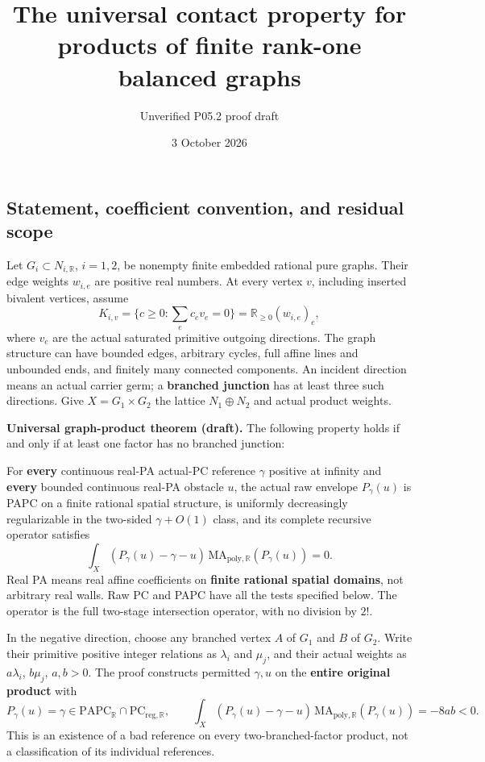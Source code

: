 \documentclass[
  11pt,
]{article}
\title{The universal contact property for products of finite rank-one
balanced graphs}
\author{Unverified P05.2 proof draft}
\date{3 October 2026}
\begin{document}
\maketitle

\subsection{Statement, coefficient convention, and residual
scope}\label{statement-coefficient-convention-and-residual-scope}

Let \(G_i\subset N_{i,\mathbb R}\), \(i=1,2\), be nonempty finite
embedded rational pure graphs. Their edge weights \(w_{i,e}\) are
positive real numbers. At every vertex \(v\), including inserted
bivalent vertices, assume \[
 K_{i,v}=\{c\geq0:\sum_e c_e v_e=0\}
       =\mathbb R_{\geq0}(w_{i,e})_e,                         \tag{1}
\] where \(v_e\) are the actual saturated primitive outgoing directions.
The graph structure can have bounded edges, arbitrary cycles, full
affine lines and unbounded ends, and finitely many connected components.
An incident direction means an actual carrier germ; a \textbf{branched
junction} has at least three such directions. Give \(X=G_1\times G_2\)
the lattice \(N_1\oplus N_2\) and actual product weights.

\textbf{Universal graph-product theorem (draft).} The following property
holds if and only if at least one factor has no branched junction:

For \textbf{every} continuous real-PA actual-PC reference \(\gamma\)
positive at infinity and \textbf{every} bounded continuous real-PA
obstacle \(u\), the actual raw envelope \(P_\gamma(u)\) is PAPC on a
finite rational spatial structure, is uniformly decreasingly
regularizable in the two-sided \(\gamma+O(1)\) class, and its complete
recursive operator satisfies \[
 \int_X(P_\gamma(u)-\gamma-u)\,
                \mathrm{MA}_{\mathrm{poly},\mathbb R}(P_\gamma(u))=0.
                                                               \tag{2}
\] Real PA means real affine coefficients on \textbf{finite rational
spatial domains}, not arbitrary real walls. Raw PC and PAPC have all the
tests specified below. The operator is the full two-stage intersection
operator, with no division by \(2!\).

In the negative direction, choose any branched vertex \(A\) of \(G_1\)
and \(B\) of \(G_2\). Write their primitive positive integer relations
as \(\lambda_i\) and \(\mu_j\), and their actual weights as
\(a\lambda_i\), \(b\mu_j\), \(a,b>0\). The proof constructs permitted
\(\gamma,u\) on the \textbf{entire original product} with \[
 P_\gamma(u)=\gamma\in\mathrm{PAPC}_{\mathbb R}
              \cap\mathrm{PC}_{\mathrm{reg},\mathbb R},\qquad
 \int_X(P_\gamma(u)-\gamma-u)\,\mathrm{MA}_{\mathrm{poly},\mathbb R}
                  (P_\gamma(u))=-8ab<0.                       \tag{3}
\] This is an existence of a bad reference on every two-branched-factor
product, not a classification of its individual references.
\end{document}
